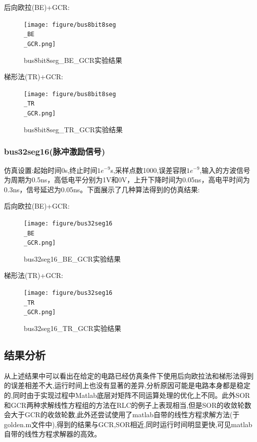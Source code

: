 \documentclass[12pt]{article}
\begin{document}
\begin{sloppypar}
后向欧拉(BE)+GCR:

\begin{figure}[H]
  \centering
  \texttt{[image: figure/bus8bit8seg\\\_BE\\\_GCR.png]}
  \caption{bus8bit8seg\_BE\_GCR实验结果}
\end{figure}

梯形法(TR)+GCR:

\begin{figure}[H]
  \centering
  \texttt{[image: figure/bus8bit8seg\\\_TR\\\_GCR.png]}
  \caption{bus8bit8seg\_TR\_GCR实验结果}
\end{figure}

\subsubsection{bus32seg16(脉冲激励信号)}
\qquad 仿真设置:起始时间0s,终止时间$1e^{-9}$s,采样点数1000,误差容限$1e^{-9}$,输入的方波信号为周期为0.5ns，高低电平分别为1V和0V，上升下降时间为0.05ns，高电平时间为0.3ns，信号延迟为0.05ns。下面展示了几种算法得到的仿真结果:

后向欧拉(BE)+GCR:

\begin{figure}[H]
  \centering
  \texttt{[image: figure/bus32seg16\\\_BE\\\_GCR.png]}
  \caption{bus32seg16\_BE\_GCR实验结果}
\end{figure}

梯形法(TR)+GCR:

\begin{figure}[H]
  \centering
  \texttt{[image: figure/bus32seg16\\\_TR\\\_GCR.png]}
  \caption{bus32seg16\_TR\_GCR实验结果}
\end{figure}

\subsection{结果分析}

\qquad 从上述结果中可以看出在给定的电路已经仿真条件下使用后向欧拉法和梯形法得到的误差相差不大,运行时间上也没有显著的差异,分析原因可能是电路本身都是稳定的,同时由于实现过程中Matlab底层对矩阵不同运算处理的优化上不同。此外SOR和GCR两种求解线性方程组的方法在RLC的例子上表现相当,但是SOR的收敛轮数会大于GCR的收敛轮数,此外还尝试使用了matlab自带的线性方程求解方法(于golden.m文件中),得到的结果与GCR,SOR相近,同时运行时间明显更快,可见matlab自带的线性方程求解器的高效。


\end{sloppypar}
\end{document}
